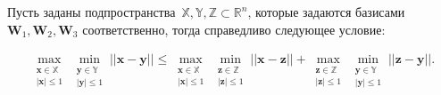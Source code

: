 \begin{lemma} \label{lem:2} 
Пусть заданы подпространства~$\mathbb{X}, \mathbb{Y}, \mathbb{Z} \subset \mathbb{R}^{n}$, которые задаются базисами~$\textbf{W}_1, \textbf{W}_2, \textbf{W}_3$ соответственно, тогда справедливо следующее условие:

\begin{equation}
\label{eq:l2:1}
\begin{aligned}
\max_{\substack{\textbf{x} \in \mathbb{X} \\ \left|\textbf{x}\right|\leq 1}}\min_{\substack{\textbf{y} \in \mathbb{Y} \\ \left|\textbf{y}\right|\leq 1}}||\textbf{x}-\textbf{y}||\leq 
\max_{\substack{\textbf{x} \in \mathbb{X} \\ \left|\textbf{x}\right|\leq 1}}\min_{\substack{\textbf{z} \in \mathbb{Z} \\ \left|\textbf{z}\right|\leq 1}}||\textbf{x}-\textbf{z}|| + 
\max_{\substack{\textbf{z} \in \mathbb{Z} \\ \left|\textbf{z}\right|\leq 1}}\min_{\substack{\textbf{y} \in \mathbb{Y} \\ \left|\textbf{y}\right|\leq 1}}||\textbf{z}-\textbf{y}||.
\end{aligned}
\end{equation}
\end{lemma}

